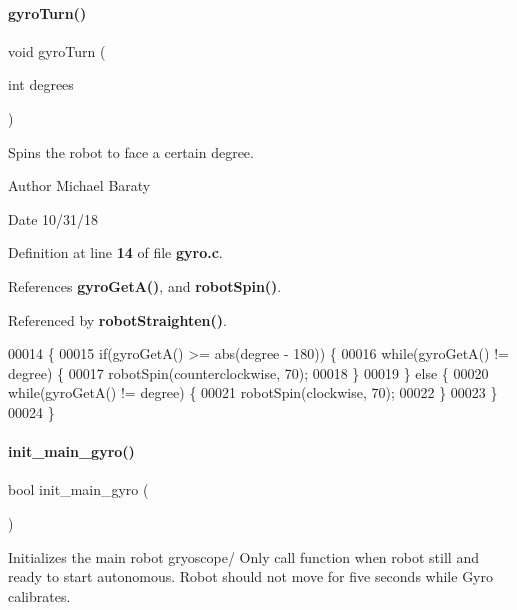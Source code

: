 \paragraph{gyro\+Turn()}
{\footnotesize\ttfamily void gyro\+Turn (\begin{DoxyParamCaption}\item[{int}]{degrees }\end{DoxyParamCaption})}



Spins the robot to face a certain degree. 

\begin{DoxyAuthor}{Author}
Michael Baraty 
\end{DoxyAuthor}
\begin{DoxyDate}{Date}
10/31/18 
\end{DoxyDate}


Definition at line \textbf{ 14} of file \textbf{ gyro.\+c}.



References \textbf{ gyro\+Get\+A()}, and \textbf{ robot\+Spin()}.



Referenced by \textbf{ robot\+Straighten()}.


\begin{DoxyCode}
00014                           \{
00015   \textcolor{keywordflow}{if}(gyroGetA() >= abs(degree - 180)) \{
00016     \textcolor{keywordflow}{while}(gyroGetA() != degree) \{
00017       robotSpin(counterclockwise, 70);
00018     \}
00019   \} \textcolor{keywordflow}{else} \{
00020     \textcolor{keywordflow}{while}(gyroGetA() != degree) \{
00021       robotSpin(clockwise, 70);
00022     \}
00023   \}
00024 \}
\end{DoxyCode}
\mbox{\label{gyro_8h_a47c0a78a867be91a28e278bf433d699c}} 
\paragraph{init\+\_\+main\+\_\+gyro()}
{\footnotesize\ttfamily bool init\+\_\+main\+\_\+gyro (\begin{DoxyParamCaption}{ }\end{DoxyParamCaption})}



Initializes the main robot gryoscope/ Only call function when robot still and ready to start autonomous. Robot should not move for five seconds while Gyro calibrates. 

